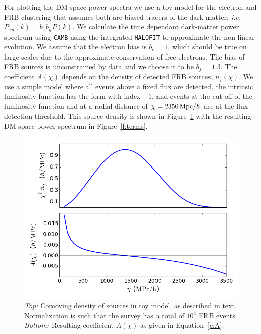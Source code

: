 \documentclass[twocolumn,prl,nofootinbib,floatfix]{revtex4-1}
\begin{document}
For plotting the DM-space power spectra we use a toy model for the electron and
FRB clustering that assumes both are biased tracers of the dark matter:
\emph{i.e.}~$P_{xy}(k)=b_x b_y P(k)$.  We
calculate the time dependant dark-matter power spectrum using {\tt CAMB} using
the integrated {\tt HALOFIT} to approximate the non-linear evolution. We assume
that the electron bias is $b_e=1$, which should be true on large scales due to
the approximate conservation of free electrons. The bias of FRB sources is
unconstrained by data and we choose it to be $b_f=1.3$. The coefficient
$A(\chi)$ depends on the density of detected FRB sources, $\bar n_f(\chi)$.
We use a simple model where all events above a fixed flux are detected,
the intrinsic luminosity function has the
\citet{1976ApJ...203..297S} form with index $-1$, and events at the cut off of the
luminosity function and at
a radial distance of $\chi=2350\,{\rm Mpc}/h$ are at the flux detection threshold.
This source density is shown in Figure~\ref{f:n_f} with the resulting DM-space
power-spectrum in Figure~\ref{f:terms}.

\begin{figure}
    \includegraphics[scale=0.42]{figures/n_f}
    \caption{
        \label{f:n_f}
        \emph{Top:} Comoving density of sources in toy model, as described in
        text. Normalization is
        such that the survey has a total of $10^4$ FRB events.
        \emph{Bottom:} Resulting coefficient $A(\chi)$ as given in
        Equation~\ref{e:A}.
    }
\end{figure}
\end{document}
